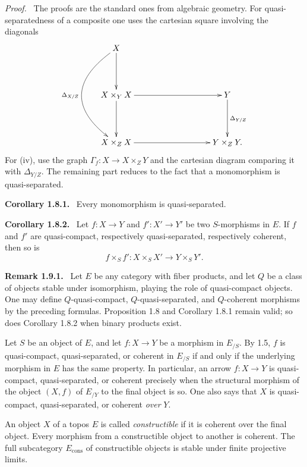 \documentclass[11pt]{article}
\newcommand{\cons}{\mathrm{cons}}
\newcommand{\fprod}[3]{{#1}\times_{#3}{#2}}
\newenvironment{statement}[1]{\par\medskip\noindent\textbf{#1.}\ }{\par\medskip}
\newenvironment{remarktext}[1]{\par\medskip\noindent\textbf{#1.}\ }{\par\medskip}
\newenvironment{prooftext}{\par\noindent\emph{Proof.}\ }{\par\medskip}
\begin{document}
\begin{prooftext}
The proofs are the standard ones from algebraic geometry. For quasi-separatedness of a composite one uses the cartesian square involving the diagonals
\[
\xymatrix@R=1.5cm@C=1.5cm{
X\ar[d]\ar@/_3.5pc/[dd]_{\Delta_{X/Z}}\\
\fprod{X}{X}{Y}\ar[d]\ar[rr]&&Y\ar[d]^{\Delta_{Y/Z}}\\
\fprod{X}{X}{Z}\ar[rr]&&\fprod{Y}{Y}{Z}.
}
\]
For (iv), use the graph \(\Gamma_f:X\to X\times_ZY\) and the cartesian diagram comparing it with \(\Delta_{Y/Z}\). The remaining part reduces to the fact that a monomorphism is quasi-separated.
\end{prooftext}

\begin{statement}{Corollary 1.8.1}
Every monomorphism is quasi-separated.
\end{statement}

\begin{statement}{Corollary 1.8.2}
Let \(f:X\to Y\) and \(f':X'\to Y'\) be two \(S\)-morphisms in \(E\). If \(f\) and \(f'\) are quasi-compact, respectively quasi-separated, respectively coherent, then so is
\[
\fprod{f}{f'}{S}:\fprod{X}{X'}{S}\longrightarrow\fprod{Y}{Y'}{S}.
\]
\end{statement}

\begin{remarktext}{Remark 1.9.1}
Let \(E\) be any category with fiber products, and let \(Q\) be a class of objects stable under isomorphism, playing the role of quasi-compact objects. One may define \(Q\)-quasi-compact, \(Q\)-quasi-separated, and \(Q\)-coherent morphisms by the preceding formulas. Proposition 1.8 and Corollary 1.8.1 remain valid; so does Corollary 1.8.2 when binary products exist.
\end{remarktext}

Let \(S\) be an object of \(E\), and let \(f:X\to Y\) be a morphism in \(E_{/S}\). By 1.5, \(f\) is quasi-compact, quasi-separated, or coherent in \(E_{/S}\) if and only if the underlying morphism in \(E\) has the same property. In particular, an arrow \(f:X\to Y\) is quasi-compact, quasi-separated, or coherent precisely when the structural morphism of the object \((X,f)\) of \(E_{/Y}\) to the final object is so. One also says that \(X\) is quasi-compact, quasi-separated, or coherent \emph{over} \(Y\).

An object \(X\) of a topos \(E\) is called \emph{constructible} if it is coherent over the final object. Every morphism from a constructible object to another is coherent. The full subcategory \(E_{\cons}\) of constructible objects is stable under finite projective limits.
\end{document}
